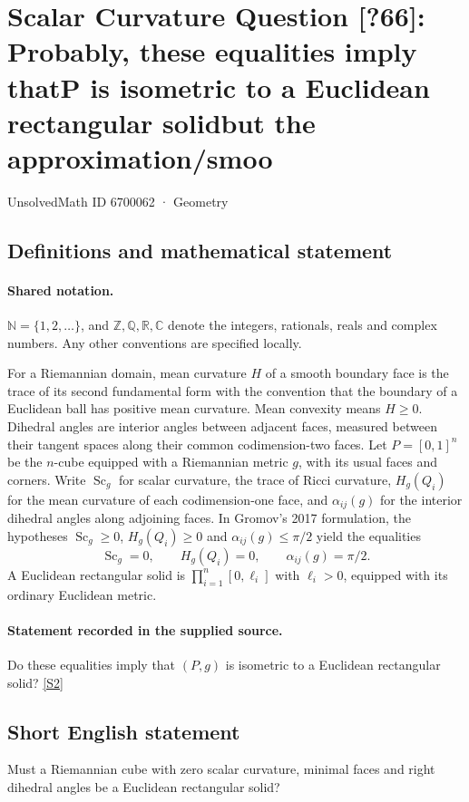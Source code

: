 \documentclass[11pt]{article}
\newcommand{\sref}[2]{\hyperlink{source:#1:#2}{[S#2]}}
\begin{document}
\setcounter{section}{6700061}
\section{Scalar Curvature Question [?66]: Probably, these equalities imply thatP is isometric to a Euclidean rectangular solidbut the approximation/smoo}\label{6700062}
{\small\sffamily UnsolvedMath ID 6700062 · Geometry}
\subsection{Definitions and mathematical statement}

\paragraph{Shared notation.}$\mathbb N=\{1,2,\ldots\}$, and $\mathbb Z,\mathbb Q,\mathbb R,\mathbb C$ denote the integers, rationals, reals and complex numbers. Any other conventions are specified locally.


For a Riemannian domain, mean curvature $H$ of a smooth boundary face is the trace of its second fundamental form with the convention that the boundary of a Euclidean ball has positive mean curvature. Mean convexity means $H\geq0$. Dihedral angles are interior angles between adjacent faces, measured between their tangent spaces along their common codimension-two faces. Let $P=[0,1]^n$ be the $n$-cube equipped with a Riemannian metric $g$, with its usual faces and corners. Write $\operatorname{Sc}_g$ for scalar curvature, the trace of Ricci curvature, $H_g(Q_i)$ for the mean curvature of each codimension-one face, and $\alpha_{ij}(g)$ for the interior dihedral angles along adjoining faces. In Gromov's 2017 formulation, the hypotheses $\operatorname{Sc}_g\geq0$, $H_g(Q_i)\geq0$ and $\alpha_{ij}(g)\leq\pi/2$ yield the equalities
\[\operatorname{Sc}_g=0,\qquad H_g(Q_i)=0,\qquad\alpha_{ij}(g)=\pi/2.\]
A Euclidean rectangular solid is $\prod_{i=1}^n[0,\ell_i]$ with $\ell_i>0$, equipped with its ordinary Euclidean metric.
\paragraph{Statement recorded in the supplied source.}
Do these equalities imply that $(P,g)$ is isometric to a Euclidean rectangular solid? \sref{6700062}{2}
\subsection{Short English statement}
Must a Riemannian cube with zero scalar curvature, minimal faces and right dihedral angles be a Euclidean rectangular solid?
\end{document}
